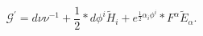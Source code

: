 \begin{equation}
\mathcal{G}^{\prime }=d\nu \nu ^{-1}+\frac{1}{2}\ast d\phi ^{i}%
\widetilde{H}_{i}+e^{\frac{1}{2}\alpha _{i}\phi ^{i}}\ast F^{\alpha
}\widetilde{E}_{\alpha }.
\end{equation}

